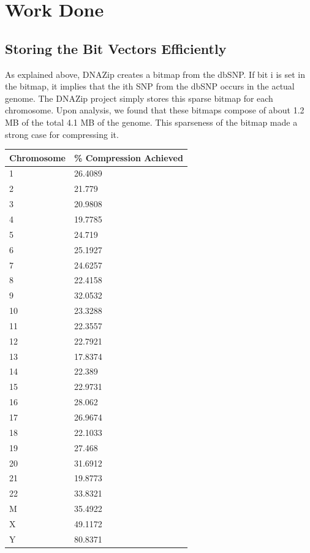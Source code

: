 \documentclass{article}
\begin{document}
\section {Work Done}

\subsection {Storing the Bit Vectors Efficiently}
As explained above, DNAZip creates a bitmap from the dbSNP. If bit i is set in the bitmap, it implies that the ith SNP from the dbSNP occurs in the actual genome. The DNAZip project simply stores this sparse bitmap for each chromosome. Upon analysis, we found that these bitmaps compose of about 1.2 MB of the total 4.1 MB of the genome. This sparseness of the bitmap made a strong case for compressing it.
\begin{center}
	\begin{tabular}{|p{1in}|p{1in}|}
	\caption{Compression achieved for each chromosome}
	\hline
	Chromosome	&		\% Compression Achieved \\
	\hline
1 & 26.4089\\
	\hline
2 & 21.779\\
	\hline
3 & 20.9808\\
	\hline
4 & 19.7785\\
	\hline
5 & 24.719\\
	\hline
6 & 25.1927\\
	\hline
7 & 24.6257\\
	\hline
8 & 22.4158\\
	\hline
9 & 32.0532\\
	\hline
10 & 23.3288\\
	\hline
11 & 22.3557\\
	\hline
12 & 22.7921\\
	\hline
13 & 17.8374\\
	\hline
14 & 22.389\\
	\hline
15 & 22.9731\\
	\hline
16 & 28.062\\
	\hline
17 & 26.9674\\
	\hline
18 & 22.1033\\
	\hline
19 & 27.468\\
	\hline
20 & 31.6912\\
	\hline
21 & 19.8773\\
	\hline
22 & 33.8321\\
	\hline
M & 35.4922\\
	\hline
X & 49.1172\\
	\hline
Y & 80.8371\\

	\hline
	\end{tabular}

\end{center}
\end{document}
